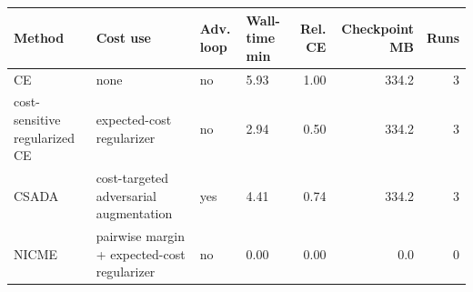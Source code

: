 \begin{tabular}{llllrrr}
\toprule
Method & Cost use & Adv. loop & Wall-time min & Rel. CE & Checkpoint MB & Runs \\
\midrule
CE & none & no & 5.93 & 1.00 & 334.2 & 3 \\
cost-sensitive regularized CE & expected-cost regularizer & no & 2.94 & 0.50 & 334.2 & 3 \\
CSADA & cost-targeted adversarial augmentation & yes & 4.41 & 0.74 & 334.2 & 3 \\
NICME & pairwise margin + expected-cost regularizer & no & 0.00 & 0.00 & 0.0 & 0 \\
\bottomrule
\end{tabular}

